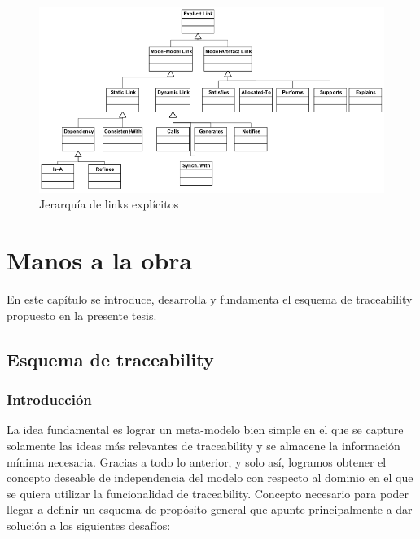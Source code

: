 \documentclass[a4paper,12pt,oneside,spanish]{book}
\begin{document}
\begin{figure}[hbtp]
\centering
\includegraphics[scale=0.51]{./img/ExplicitTraceLinks}
\caption{Jerarquía de links explícitos}
\label{fig:LinksExplicitos}
\end{figure}



\chapter{Manos a la obra}
\label{cap:Propuesta}

En este capítulo se introduce, desarrolla y fundamenta el esquema de traceability propuesto en la presente tesis.


\section{Esquema de traceability}


\subsection{Introducción}
\label{sec:EsquemaPropIntro}

La idea fundamental es lograr un meta-modelo bien simple en el que se capture solamente las ideas más relevantes de traceability y se almacene la información mínima necesaria. Gracias a todo lo anterior, y solo así, logramos obtener el concepto deseable de independencia del modelo con respecto al dominio en el que se quiera utilizar la funcionalidad de traceability. Concepto necesario para poder llegar a definir un esquema de propósito general que apunte principalmente a dar solución a los siguientes desafíos:
\end{document}
